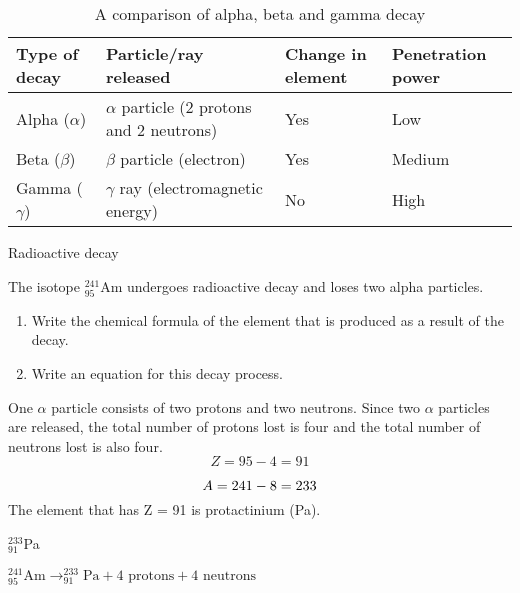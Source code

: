 \begin{table}[H]
\begin{center}
\begin{tabular}{|l|l|p{1.5cm}|p{2cm}|}\hline
\textbf{Type of decay} & \textbf{Particle/ray released} & \textbf{Change in element} & \textbf{Penetration power} \\\hline
Alpha ($\alpha$) & $\alpha$ particle (2 protons and 2 neutrons) & Yes & Low \\\hline
Beta ($\beta$) & $\beta$ particle (electron)  &  Yes & Medium \\\hline
Gamma ($\gamma$) & $\gamma$ ray (electromagnetic energy) & No & High \\\hline
\end{tabular}
\caption{A comparison of alpha, beta and gamma decay}
\label{tab:radiation type summary}
\end{center}
\end{table}
\begin{wex}{Radioactive decay}{The isotope $^{241}_{95}$Am undergoes radioactive decay and loses two alpha particles.
\begin{enumerate}
\item{Write the chemical formula of the element that is produced as a result of the decay.}
\item{Write an equation for this decay process.}
\end{enumerate}
}{
One $\alpha$ particle consists of two protons and two neutrons. Since two $\alpha$ particles are released, the total number of protons lost is four and the total number of neutrons lost is also four.
\begin{equation*}
Z = 95 - 4
= 91
\end{equation*}

\begin{equation*}
A = 241 - 8
= 233\\
\end{equation*}
The element that has Z = 91 is protactinium (Pa).
\begin{center}
$^{233}_{91}$Pa 
\end{center}
\begin{center}
$^{241}_{95}\text{Am} \rightarrow ^{233}_{91}\text{Pa} + 4 \text{ protons} + 4 \text{ neutrons}$
\end{center}
}
\end{wex}
